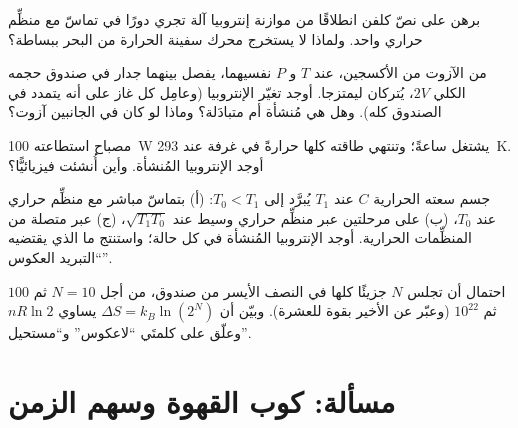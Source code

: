 \begin{exercise}[$\star\star$]\label{exo:b1:second-law-entropy:8}
برهن على نصّ كلفن انطلاقًا من موازنة إنتروبيا آلة تجري
دورًا في تماسّ مع منظِّم حراري واحد. ولماذا لا يستخرج محرك سفينة
الحرارة من البحر ببساطة؟
\end{exercise}

\begin{exercise}[$\star\star$]\label{exo:b1:second-law-entropy:9}
 من الآزوت  من الأكسجين، عند $T$ و $P$ نفسيهما،
يفصل بينهما جدار في صندوق حجمه الكلي $2V$، يُتركان ليمتزجا. أوجد تغيّر
الإنتروبيا (وعامِل كل غاز على أنه يتمدد في الصندوق كله). وهل هي مُنشأة
أم متبادَلة؟ وماذا لو كان في الجانبين آزوت؟
\end{exercise}

\begin{exercise}[$\star\star\star$]\label{exo:b1:second-law-entropy:10}
مصباح استطاعته \qty{100}{W} يشتغل ساعةً؛ وتنتهي طاقته كلها حرارةً في
غرفة عند \qty{293}{K}. أوجد الإنتروبيا المُنشأة. وأين أُنشئت
فيزيائيًّا؟
\end{exercise}

\begin{exercise}[$\star\star\star$]\label{exo:b1:second-law-entropy:11}
جسم سعته الحرارية $C$ عند $T_1$ يُبرَّد إلى $T_0 < T_1$: (أ) بتماسّ
مباشر مع منظِّم حراري عند $T_0$، (ب) على مرحلتين عبر منظِّم
حراري وسيط عند $\sqrt{T_1T_0}$، (ج) عبر متصلة من
المنظِّمات الحرارية. أوجد الإنتروبيا المُنشأة في كل حالة؛ واستنتج ما الذي
يقتضيه ``التبريد العكوس''.
\end{exercise}

\begin{exercise}[$\star\star\star$]\label{exo:b1:second-law-entropy:12}
احتمال أن تجلس $N$ جزيئًا كلها في النصف الأيسر من صندوق، من أجل
$N = 10$ ثم $100$ ثم $10^{22}$ (وعبّر عن الأخير بقوة للعشرة). وبيّن أن
$\Delta S = k_B\ln(2^N)$ يساوي $nR\ln2$ وعلّق على كلمتَي
``لاعكوس'' و``مستحيل''.
\end{exercise}

\section{مسألة: كوب القهوة وسهم الزمن}

